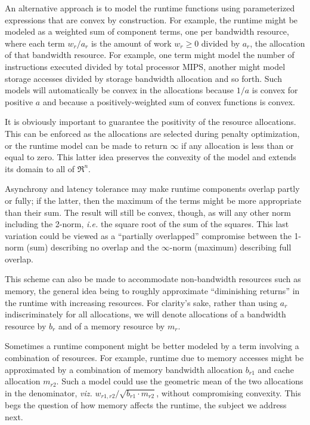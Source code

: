 An alternative approach is to model the runtime functions using parameterized expressions that are convex by construction.
For example, the runtime might be modeled as a weighted sum of component terms,
one per bandwidth resource, where each term $w_r/a_r$ is
the amount of work $w_r \geq 0$ divided by $a_r$, the allocation of that bandwidth resource\cite{Sn}.
For example,
one term might model the number of instructions executed divided by total processor MIPS,
another might model storage accesses divided by storage bandwidth allocation and so forth.
Such models will automatically be convex in the allocations because $1/a$ is convex for positive $a$
and because a positively-weighted sum of convex functions is convex.

It is obviously important to guarantee the positivity of the resource allocations.
This can be enforced as the allocations are selected during penalty optimization,
or the runtime model can be made to return $\infty$ if any allocation is less than or equal to zero.
This latter idea preserves the convexity of the model and extends its domain to all of $\Re^n$.

Asynchrony and latency tolerance may make runtime components overlap partly or fully;
if the latter, then the maximum of the terms might be more appropriate than their sum.
The result will still be convex, though, as will any other norm including the 2-norm,
\emph{i.e.} the square root of the sum of the squares.
This last variation could be viewed as a ``partially overlapped'' compromise between
the 1-norm (sum) describing no overlap and the $\infty$-norm (maximum) describing full overlap.

This scheme can also be made to accommodate non-bandwidth resources such as memory,
the general idea being to roughly approximate ``diminishing returns'' in the runtime with increasing resources.
For clarity's sake, rather than using $a_r$ indiscriminately for all allocations,
we will denote allocations of a bandwidth resource by $b_r$ and of a memory resource by $m_r$.

Sometimes a runtime component might be better modeled by a term involving a combination of resources.
For example, runtime due to memory accesses might be approximated
by a combination of memory bandwidth allocation $b_{r1}$ and cache allocation $m_{r2}$.
Such a model could use the geometric mean of the two allocations in the denominator,
\emph{viz.} $w_{r1,r2}/\sqrt{b_{r1}\cdot m_{r2}}$, without compromising convexity.
This begs the question of how memory affects the runtime, the subject we address next.

